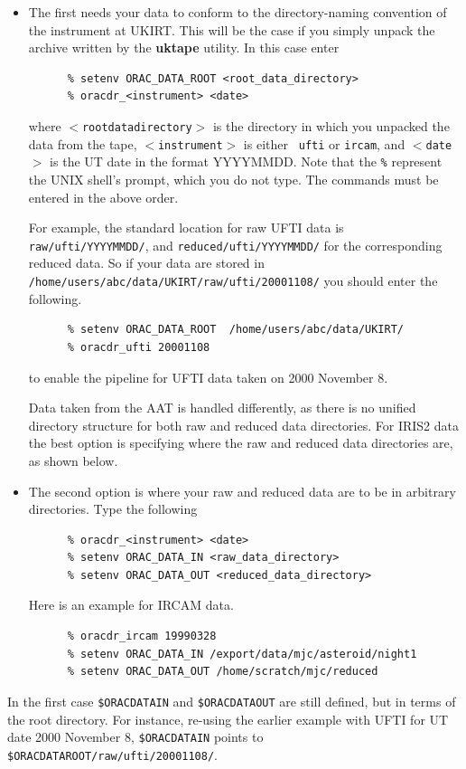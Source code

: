 \documentclass[twoside,11pt]{article}
\renewcommand{\_}{\texttt{\symbol{95}}}
\begin{document}
\begin{itemize}

\item  The first needs your data to conform to the directory-naming
convention of the instrument at UKIRT.  This will be the case if you
simply unpack the archive written by the {\bf uktape} utility.  In
this case enter

\begin{verbatim}
      % setenv ORAC_DATA_ROOT <root_data_directory>
      % oracdr_<instrument> <date>
\end{verbatim}
where {\tt $<$root\_data\_directory$>$} is the directory in which you
unpacked the data from the tape, {\tt $<$instrument$>$} is either {\tt
ufti} or {\tt ircam}, and {\tt$<$date$>$} is the UT date in the format
YYYYMMDD.  Note that the \texttt{\%} represent the UNIX shell's
prompt, which you do not type.  The commands must be entered in the
above order.  

For example, the standard location for raw UFTI data is {\tt
raw/ufti/YYYYMMDD/}, and {\tt reduced/ufti/YYYYMMDD/} for the
corresponding reduced data.  So if your data are stored in {\tt
/home/users/abc/data/UKIRT/raw/ufti/20001108/} you should enter the
following.

\begin{verbatim}
      % setenv ORAC_DATA_ROOT  /home/users/abc/data/UKIRT/
      % oracdr_ufti 20001108
\end{verbatim}
to enable the pipeline for UFTI data taken on 2000 November 8.

Data taken from the AAT is handled differently, as there is no
unified directory structure for both raw and reduced data directories.
For IRIS2 data the best option is specifying where the raw and
reduced data directories are, as shown below.

\item The second option is where your raw and reduced data are to be
in arbitrary directories.  Type the following

\begin{verbatim}
      % oracdr_<instrument> <date>
      % setenv ORAC_DATA_IN <raw_data_directory>
      % setenv ORAC_DATA_OUT <reduced_data_directory>
\end{verbatim}

Here is an example for IRCAM data.
\begin{verbatim}
      % oracdr_ircam 19990328
      % setenv ORAC_DATA_IN /export/data/mjc/asteroid/night1
      % setenv ORAC_DATA_OUT /home/scratch/mjc/reduced
\end{verbatim}

\end{itemize}
In the first case {\tt \$ORAC\_DATA\_IN} and {\tt \$ORAC\_DATA\_OUT} are
still defined, but in terms of the root directory.  For instance, re-using
the earlier example with UFTI for UT date 2000 November 8,
{\tt \$ORAC\_DATA\_IN} points to {\tt \$ORAC\_DATA\_ROOT/raw/ufti/20001108/}.
\end{document}

